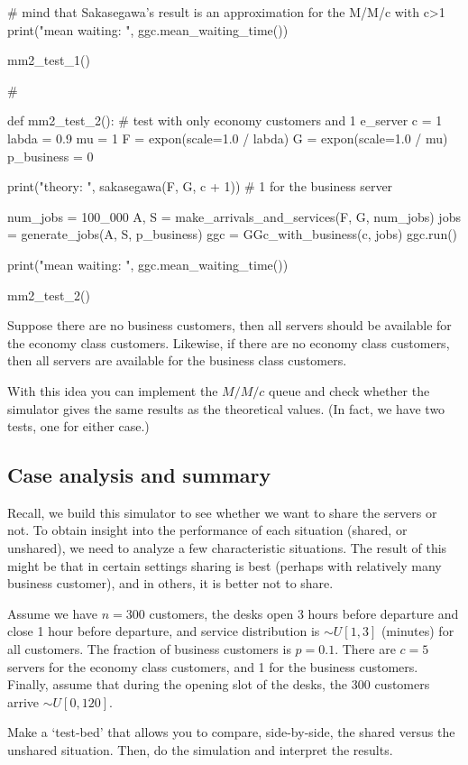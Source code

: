 \begin{exercise}
\begin{solution}
\begin{pyverbatim}
    # mind that Sakasegawa's result is an approximation for the M/M/c with c>1
    print("mean waiting: ", ggc.mean_waiting_time())


mm2_test_1()


# %


def mm2_test_2():
    # test with only economy customers and 1 e_server
    c = 1
    labda = 0.9
    mu = 1
    F = expon(scale=1.0 / labda)
    G = expon(scale=1.0 / mu)
    p_business = 0

    print("theory: ", sakasegawa(F, G, c + 1))  # 1 for the business server

    num_jobs = 100_000
    A, S = make_arrivals_and_services(F, G, num_jobs)
    jobs = generate_jobs(A, S, p_business)
    ggc = GGc_with_business(c, jobs)
    ggc.run()

    print("mean waiting: ", ggc.mean_waiting_time())


mm2_test_2()
\end{pyverbatim}
    
\end{solution}

\end{exercise}

\begin{exercise}
  Suppose there are no business customers, then all servers should be available for the economy class customers.
  Likewise, if there are no economy class customers, then all servers are available for the business class customers.

  With this idea you can implement the $M/M/c$ queue and check whether the simulator gives the same results as the theoretical values. (In fact, we have two tests, one for either case.)
\end{exercise}

\subsection{Case analysis and summary}
\label{sec:cases}

Recall, we build this simulator to see whether we want to share the servers or not.
To obtain insight into the performance of each situation (shared, or unshared), we need to analyze a few characteristic situations.
The result of this might be that in certain settings sharing is best (perhaps with relatively many business customer), and in others, it is better not to share.

\begin{exercise}
  Assume we have $n=300$ customers, the desks open 3 hours before departure and close 1 hour before departure, and service distribution is $\sim U[1,3]$ (minutes) for all customers.
  The fraction of business customers is $p=0.1$.
  There are $c=5$ servers for the economy class customers, and 1 for the business customers.
  Finally, assume that during the opening slot of the desks, the 300 customers arrive $\sim U[0, 120]$.

Make a `test-bed' that allows you to compare, side-by-side, the shared versus the unshared situation. Then, do the simulation and interpret the results.
\end{exercise}

